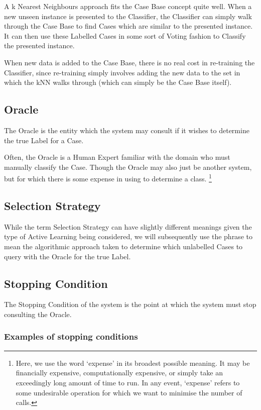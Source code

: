 \documentclass[a4paper,11pt]{report}
\begin{document}
A k Nearest Neighbours approach fits the Case Base concept quite well. When a new unseen instance is presented to the Classifier, the Classifier can simply walk through the Case Base to find Cases which are similar to the presented instance. It can then use these Labelled Cases in some sort of Voting fashion to Classify the presented instance.

When new data is added to the Case Base, there is no real cost in re-training the Classifier, since re-training simply involves adding the new data to the set in which the kNN walks through (which can simply be the Case Base itself).

\subsection{Oracle}
The Oracle is the entity which the system may consult if it wishes to determine the true Label for a Case.

Often, the Oracle is a Human Expert familiar with the domain who must manually classify the Case. Though the Oracle may also just be another system, but for which there is some expense in using to determine a class. \footnote{Here, we use the word `expense' in its broadest possible meaning. It may be financially expensive, computationally expensive, or simply take an exceedingly long amount of time to run. In any event, `expense' refers to some undesirable operation for which we want to minimise the number of calls.}

\subsection{Selection Strategy}
While the term Selection Strategy can have slightly different meanings given the type of Active Learning being considered, we will subsequently use the phrase to mean the algorithmic approach taken to determine which unlabelled Cases to query with the Oracle for the true Label.

\subsection{Stopping Condition}
The Stopping Condition of the system is the point at which the system must stop consulting the Oracle.

\subsubsection{Examples of stopping conditions}
\end{document}

